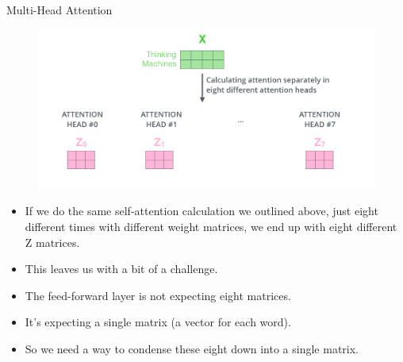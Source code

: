\documentclass[handout]{beamer}
\begin{document}
\begin{frame}{Multi-Head Attention}

     \begin{figure}[h]
        	\includegraphics[scale = 0.25]{pics/transformer_attention_heads_z.png}
        \end{figure}


\begin{scriptsize}
\begin{itemize}
 \item If we do the same self-attention calculation we outlined above, just eight different times with different weight matrices, we end up with eight different Z matrices.
 \item This leaves us with a bit of a challenge.
 \item The feed-forward layer is not expecting eight matrices.
 \item It's expecting a single matrix (a vector for each word).
 \item So we need a way to condense these eight down into a single matrix.


\end{itemize}

\end{scriptsize}

\end{frame}
\end{document}
